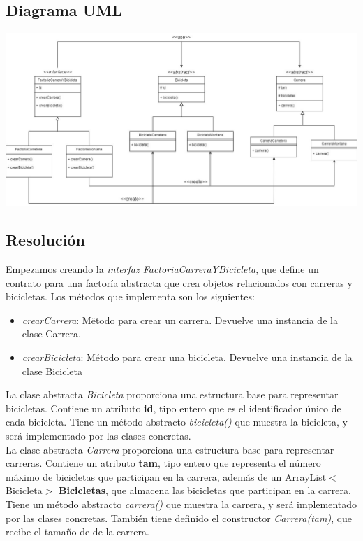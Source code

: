 \documentclass{article} %
\begin{document}
    \newpage

    \subsection{Diagrama UML}
    \includegraphics[width=\textwidth]{imagenes/Ejercicio 1.jpeg}

    \subsection{Resolución}
    \hspace*{1cm}Empezamos creando la \textit{interfaz FactoriaCarreraYBicicleta}, que define un contrato para una factoría abstracta que
    crea objetos relacionados con carreras y bicicletas. Los métodos que implementa son los siguientes:

    \begin{itemize}
        \item \textit{crearCarrera}: Mëtodo para crear un carrera. Devuelve una instancia de la clase Carrera.
        \item \textit{crearBicicleta}: Método para crear una bicicleta. Devuelve una instancia de la clase Bicicleta
    \end{itemize}

    \hspace*{1cm}La clase abstracta \textit{Bicicleta} proporciona una estructura base para representar bicicletas.
    Contiene un atributo \textbf{id}, tipo entero que es el identificador único de cada bicicleta.
    Tiene un método abstracto \textit{bicicleta()} que muestra la bicicleta, y será implementado por las clases concretas.\\
    
    \hspace*{1cm}La clase abstracta \textit{Carrera} proporciona una estructura base para representar carreras.
    Contiene un atributo \textbf{tam}, tipo entero que representa el número máximo de bicicletas que participan en la carrera,
    además de un ArrayList$<$Bicicleta$>$ \textbf{Bicicletas}, que almacena las bicicletas que participan en la carrera.
    Tiene un método abstracto \textit{carrera()} que muestra la carrera, y será implementado por las clases concretas.
    También tiene definido el constructor \textit{Carrera(tam)}, que recibe el tamaño de de la carrera. \\
\end{document}
